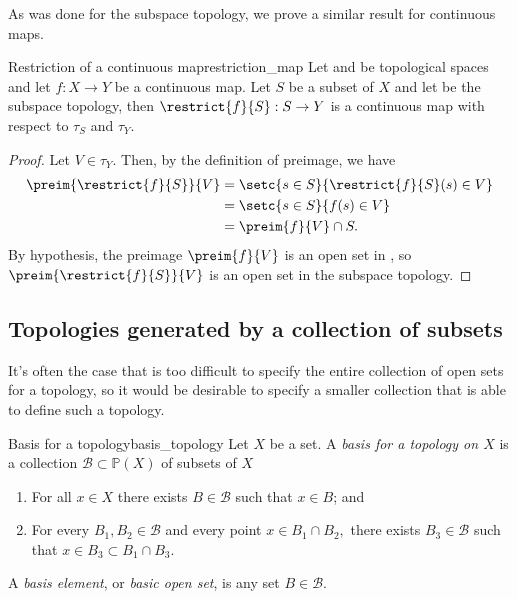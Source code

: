 As was done for the subspace topology, we prove a similar result for continuous maps.
\begin{proposition}{Restriction of a continuous map}{restriction_map}
    Let  and  be topological spaces and let \(f : X \to Y\) be a continuous map. Let \(S\) be a subset of \(X\) and let  be the subspace topology, then \(\restrict{f}{S} : S \to Y\) is a continuous map with respect to \(\tau_S\) and \(\tau_Y\).
\end{proposition}
\begin{proof}
    Let \(V \in \tau_Y\). Then, by the definition of preimage, we have
    \begin{align*}
        \preim{\restrict{f}{S}}{V} &= \setc{s \in S}{\restrict{f}{S}(s) \in V}\\
                                &= \setc{s \in S}{f(s) \in V}\\
                                &= \preim{f}{V} \cap S.
    \end{align*}
    By hypothesis, the preimage \(\preim{f}{V}\) is an open set in , so \(\preim{\restrict{f}{S}}{V}\) is an open set in the subspace topology.
\end{proof}

\subsection{Topologies generated by a collection of subsets}
It's often the case that is too difficult to specify the entire collection of open sets for a topology, so it would be desirable to specify a smaller collection that is able to define such a topology.
\begin{definition}{Basis for a topology}{basis_topology}
    Let \(X\) be a set. A \emph{basis for a topology on \(X\)} is a collection \(\mathcal{B}\subset\mathbb{P}(X)\) of subsets of \(X\)
    \begin{enumerate}[label=(\alph*)]
        \item For all \(x \in X\) there exists \(B \in \mathcal{B}\) such that \(x \in B\); and
        \item For every \(B_1, B_2  \in \mathcal{B}\) and every point \(x \in B_1 \cap B_2,\) there exists \(B_3 \in \mathcal{B}\) such that \(x \in B_3 \subset B_1 \cap B_3\).
    \end{enumerate}
    A \emph{basis element}, or \emph{basic open set}, is any set \(B \in \mathcal{B}\).
\end{definition}

